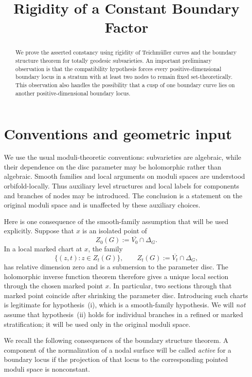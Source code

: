 \documentclass[11pt]{article}
\title{Rigidity of a Constant Boundary Factor}
\author{}
\date{}
\newcommand{\ol}[1]{\overline{#1}}
\theoremstyle{remark}
\begin{document}
\maketitle

\begin{abstract}
We prove the asserted constancy using rigidity of Teichm\"uller curves
and the boundary structure theorem for totally geodesic subvarieties.
An important preliminary observation is that the compatibility
hypothesis forces every positive-dimensional boundary locus in a
stratum with at least two nodes to remain fixed set-theoretically.
This observation also handles the possibility that a cusp of one
boundary curve lies on another positive-dimensional boundary locus.
\end{abstract}

\section{Conventions and geometric input}

We use the usual moduli-theoretic conventions: subvarieties are
algebraic, while their dependence on the disc parameter may be
holomorphic rather than algebraic. Smooth families and local
arguments on moduli spaces are understood orbifold-locally.
Thus auxiliary level structures and local labels for components and
branches of nodes may be introduced. The conclusion is a statement
on the original moduli space and is unaffected by these auxiliary
choices.

Here is one consequence of the smooth-family assumption that will
be used explicitly. Suppose that \(x\) is an isolated point of
\[
Z_0(G):=\ol{V_0}\cap\Delta_G.
\]
In a local marked chart at \(x\), the family
\[
\{(z,t):z\in Z_t(G)\},\qquad
Z_t(G):=\ol{V_t}\cap\Delta_G,
\]
has relative dimension zero and is a submersion to the parameter
disc. The holomorphic inverse function theorem therefore gives
a unique local section through the chosen marked point \(x\).
In particular, two sections through that marked point coincide
after shrinking the parameter disc. Introducing such charts is
legitimate for hypothesis~(i), which is a smooth-family hypothesis.
We will \emph{not} assume that hypothesis~(ii) holds for individual
branches in a refined or marked stratification; it will be used
only in the original moduli space.

We recall the following consequences of the boundary structure
theorem. A component of the normalization of a nodal surface will
be called \emph{active} for a boundary locus if the projection of
that locus to the corresponding pointed moduli space is
nonconstant.
\end{document}
